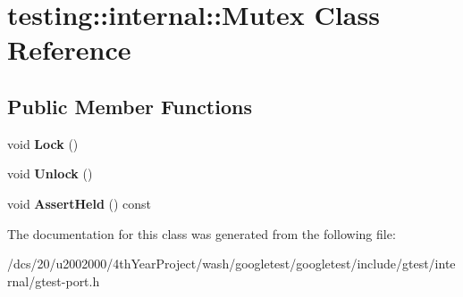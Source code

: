 \hypertarget{classtesting_1_1internal_1_1Mutex}{}\section{testing\+:\+:internal\+:\+:Mutex Class Reference}
\label{classtesting_1_1internal_1_1Mutex}
\subsection*{Public Member Functions}
\begin{DoxyCompactItemize}
\item 
\mbox{\label{classtesting_1_1internal_1_1Mutex_ae7e2191886c00182176b23c4f4d049f8}} 
void {\bfseries Lock} ()
\item 
\mbox{\label{classtesting_1_1internal_1_1Mutex_a315188055de1be98884519ad84eff2e6}} 
void {\bfseries Unlock} ()
\item 
\mbox{\label{classtesting_1_1internal_1_1Mutex_af45bf1660ac4110338a02a8680b2f486}} 
void {\bfseries Assert\+Held} () const
\end{DoxyCompactItemize}


The documentation for this class was generated from the following file\+:\begin{DoxyCompactItemize}
\item 
/dcs/20/u2002000/4th\+Year\+Project/wash/googletest/googletest/include/gtest/internal/gtest-\/port.\+h\end{DoxyCompactItemize}
